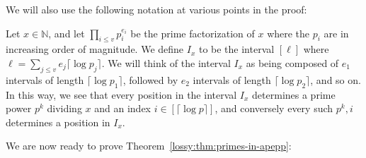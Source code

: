 We will also use the following notation at various points in the proof:
\begin{definition}
Let $x \in \mathbb{N}$, and let $\prod\limits_{i \leq v} p_i^{e_i}$ be the prime factorization of $x$ where the $p_i$ are in increasing order of magnitude. We define $I_x$ to be the interval $[\ell]$ where $\ell = \sum\limits_{j \leq v} e_j \lceil \log p_j \rceil$. We will think of the interval $I_x$ as being composed of $e_1$ intervals of length $\lceil \log p_1\rceil$, followed by $e_2$ intervals of length $\lceil \log p_2\rceil$, and so on. In this way, we see that every position in the interval $I_x$ determines a prime power $p^k$ dividing $x$ and an index $i \in [\lceil \log p \rceil]$, and conversely every such $p^k,i$ determines a position in $I_x$.
\end{definition}
We are now ready to prove Theorem~\ref{lossy:thm:primes-in-apepp}:
